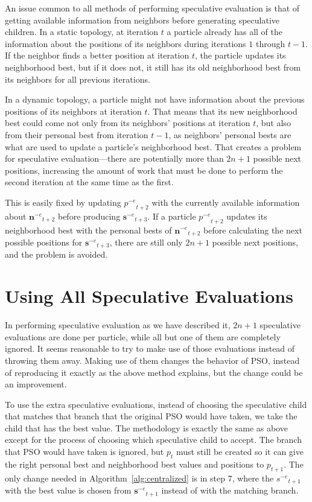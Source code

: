 \documentclass[oneside,honors]{honors}
\newcommand{\alg}[1]{Algorithm~\ref{alg:#1}}
\providecommand{\noeval}[1]{\ensuremath{#1^{-e}}}
\providecommand{\p}{\ensuremath{p}}
\providecommand{\s}{\ensuremath{s}}
\providecommand{\sset}{\ensuremath{\mathbf{s}}}
\providecommand{\nset}{\ensuremath{\mathbf{n}}}
\begin{document}
An issue common to all methods of performing speculative evaluation is that of
getting available information from neighbors before generating speculative
children.  In a static topology, at iteration $t$ a particle already has all of
the information about the positions of its neighbors during iterations $1$
through $t-1$.  If the neighbor finds a better position at iteration $t$, the
particle updates its neighborhood best, but if it does not, it still has its
old neighborhood best from its neighbors for all previous iterations.

In a dynamic topology, a particle might not have information about the previous
positions of its neighbors at iteration $t$.  That means that its new
neighborhood best could come not only from its neighbors' positions at
iteration $t$, but also from their personal best from iteration $t-1$, as
neighbors' personal bests are what are used to update a particle's neighborhood
best.  That creates a problem for speculative evaluation---there are
potentially more than $2n+1$ possible next positions, increasing the amount
of work that must be done to perform the second iteration at the same time as
the first.

This is easily fixed by updating $\noeval{\p}_{t+2}$ with the currently
available information about $\noeval{\nset}_{t+2}$ before producing
$\noeval{\sset}_{t+3}$.  If a particle $\noeval{\p}_{t+2}$ updates its 
neighborhood best with the personal bests of $\noeval{\nset}_{t+2}$ before
calculating the next possible positions for $\noeval{\sset}_{t+3}$, there are
still only $2n+1$ possible next positions, and the problem is avoided.

\section{Using All Speculative Evaluations}
\label{sec:extra}

In performing speculative evaluation as we have described it, $2n+1$
speculative evaluations are done per particle, while all but one of them are
completely ignored.  It seems reasonable to try to make use of those
evaluations instead of throwing them away.  Making use of them changes the
behavior of PSO, instead of reproducing it exactly as the above method
explains, but the change could be an improvement.

To use the extra speculative evaluations, instead of choosing the speculative
child that matches that branch that the original PSO would have taken, we take
the child that has the best value.  The methodology is exactly the same as
above except for the process of choosing which speculative child to accept.
The branch that PSO would have taken is ignored, but $\p_t$ must still be
created so it can give the right personal best and neighborhood best values and
positions to $\p_{t+1}$.  The only change needed in \alg{centralized} is in
step 7, where the $\noeval{\s}_{t+1}$ with the best value is chosen from
$\noeval{\sset}_{t+1}$ instead of with the matching branch.
\end{document}
